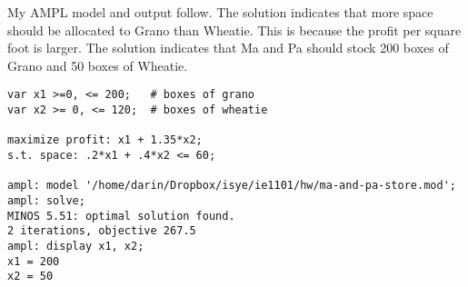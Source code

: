 \begin{enumerate}
\begin{solution}
\bs My AMPL model and output follow. The solution indicates that more
space should be allocated to Grano than Wheatie. This is because
the profit per square foot is larger. The solution indicates that
Ma and Pa should stock 200 boxes of Grano and 50 boxes of Wheatie.

\begin{Verbatim}[samepage=true]
var x1 >=0, <= 200;   # boxes of grano
var x2 >= 0, <= 120;  # boxes of wheatie

maximize profit: x1 + 1.35*x2;
s.t. space: .2*x1 + .4*x2 <= 60;

ampl: model '/home/darin/Dropbox/isye/ie1101/hw/ma-and-pa-store.mod';
ampl: solve;
MINOS 5.51: optimal solution found.
2 iterations, objective 267.5
ampl: display x1, x2;
x1 = 200
x2 = 50
\end{Verbatim}
\end{solution}

\end{enumerate}
